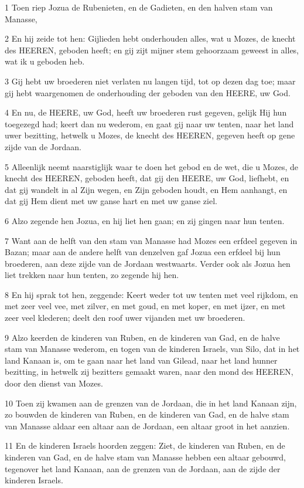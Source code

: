 \par 1 Toen riep Jozua de Rubenieten, en de Gadieten, en den halven stam van Manasse,
\par 2 En hij zeide tot hen: Gijlieden hebt onderhouden alles, wat u Mozes, de knecht des HEEREN, geboden heeft; en gij zijt mijner stem gehoorzaam geweest in alles, wat ik u geboden heb.
\par 3 Gij hebt uw broederen niet verlaten nu langen tijd, tot op dezen dag toe; maar gij hebt waargenomen de onderhouding der geboden van den HEERE, uw God.
\par 4 En nu, de HEERE, uw God, heeft uw broederen rust gegeven, gelijk Hij hun toegezegd had; keert dan nu wederom, en gaat gij naar uw tenten, naar het land uwer bezitting, hetwelk u Mozes, de knecht des HEEREN, gegeven heeft op gene zijde van de Jordaan.
\par 5 Alleenlijk neemt naarstiglijk waar te doen het gebod en de wet, die u Mozes, de knecht des HEEREN, geboden heeft, dat gij den HEERE, uw God, liefhebt, en dat gij wandelt in al Zijn wegen, en Zijn geboden houdt, en Hem aanhangt, en dat gij Hem dient met uw ganse hart en met uw ganse ziel.
\par 6 Alzo zegende hen Jozua, en hij liet hen gaan; en zij gingen naar hun tenten.
\par 7 Want aan de helft van den stam van Manasse had Mozes een erfdeel gegeven in Bazan; maar aan de andere helft van denzelven gaf Jozua een erfdeel bij hun broederen, aan deze zijde van de Jordaan westwaarts. Verder ook als Jozua hen liet trekken naar hun tenten, zo zegende hij hen.
\par 8 En hij sprak tot hen, zeggende: Keert weder tot uw tenten met veel rijkdom, en met zeer veel vee, met zilver, en met goud, en met koper, en met ijzer, en met zeer veel klederen; deelt den roof uwer vijanden met uw broederen.
\par 9 Alzo keerden de kinderen van Ruben, en de kinderen van Gad, en de halve stam van Manasse wederom, en togen van de kinderen Israels, van Silo, dat in het land Kanaan is, om te gaan naar het land van Gilead, naar het land hunner bezitting, in hetwelk zij bezitters gemaakt waren, naar den mond des HEEREN, door den dienst van Mozes.
\par 10 Toen zij kwamen aan de grenzen van de Jordaan, die in het land Kanaan zijn, zo bouwden de kinderen van Ruben, en de kinderen van Gad, en de halve stam van Manasse aldaar een altaar aan de Jordaan, een altaar groot in het aanzien.
\par 11 En de kinderen Israels hoorden zeggen: Ziet, de kinderen van Ruben, en de kinderen van Gad, en de halve stam van Manasse hebben een altaar gebouwd, tegenover het land Kanaan, aan de grenzen van de Jordaan, aan de zijde der kinderen Israels.

